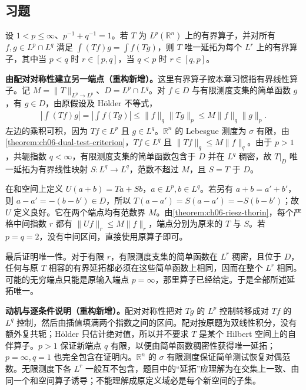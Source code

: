 \documentclass[../../main.tex]{subfiles}
\begin{document}
\subsection*{习题}
\setcounter{exer}{40}
\begin{exercise}\label{exercise:ch06-symmetric-operator-interpolation}
设 $1<p\leqslant\infty$、$p^{-1}+q^{-1}=1$。若 $T$ 为 $L^p(\mathbb R^n)$ 上的有界算子，并对所有 $f,g\in L^p\cap L^q$ 满足 $\int(Tf)g=\int f(Tg)$，则 $T$ 唯一延拓为每个 $L^r$ 上的有界算子，其中当 $p<q$ 时 $r\in[p,q]$，当 $q<p$ 时 $r\in[q,p]$。
\end{exercise}
\begin{solution}
\textbf{由配对对称性建立另一端点（重构新增）。}这里有界算子按本章习惯指有界线性算子。记 $M=\|T\|_{L^p\to L^p}$、$D=L^p\cap L^q$。对 $f\in D$ 与有限测度支集的简单函数 $g$，有 $g\in D$，由原假设及 Hölder 不等式，
\begin{align*}
\left|\int(Tf)g\right|=\left|\int f(Tg)\right|
\leqslant\|f\|_q\|Tg\|_p
\leqslant M\|f\|_q\|g\|_p.
\end{align*}
左边的乘积可积，因为 $Tf\in L^p$ 且 $g\in L^q$。$\mathbb R^n$ 的 Lebesgue 测度为 $\sigma$ 有限，由\cref{theorem:ch06-dual-test-criterion}，$Tf\in L^q$ 且 $\|Tf\|_q\leqslant M\|f\|_q$。由于 $p>1$，共轭指数 $q<\infty$，有限测度支集的简单函数包含于 $D$ 并在 $L^q$ 稠密，故 $T|_D$ 唯一延拓为有界线性映射 $S:L^q\to L^q$，范数不超过 $M$，且 $S=T$ 于 $D$。

在和空间上定义 $U(a+b)=Ta+Sb$，$a\in L^p,b\in L^q$。若另有 $a+b=a'+b'$，则 $a-a'=-(b-b')\in D$，所以 $T(a-a')=S(a-a')=-S(b-b')$；故 $U$ 定义良好。它在两个端点均有范数界 $M$。由\cref{theorem:ch06-riesz-thorin}，每个严格中间指数 $r$ 都有 $\|Uf\|_r\leqslant M\|f\|_r$，端点分别为原来的 $T$ 与 $S$。若 $p=q=2$，没有中间区间，直接使用原算子即可。

最后证明唯一性。对于有限 $r$，有限测度支集的简单函数在 $L^r$ 稠密，且位于 $D$，任何与原 $T$ 相容的有界延拓都必须在这些简单函数上相同，因而在整个 $L^r$ 相同。可能的无穷端点只能是原输入端点 $p=\infty$，那里算子已经给定。于是全部所述延拓唯一。
\end{solution}
\begin{remark}
\textbf{动机与逐条件说明（重构新增）。}配对对称性把对 $Tg$ 的 $L^p$ 控制转移成对 $Tf$ 的 $L^q$ 控制，然后由插值填满两个指数之间的区间。配对按原题为双线性积分，没有额外复共轭；Hölder 只估计绝对值，所以并不要求 $T$ 是某个 Hilbert 空间上的自伴算子。$p>1$ 保证新端点 $q$ 有限，以便由简单函数稠密性获得唯一延拓；$p=\infty,q=1$ 也完全包含在证明内。$\mathbb R^n$ 的 $\sigma$ 有限测度保证简单测试恢复对偶范数。无限测度下各 $L^r$ 一般互不包含，题目中的“延拓”应理解为在交集上一致、由同一个和空间算子诱导；不能理解成原定义域必是每个新空间的子集。
\end{remark}
\end{document}
